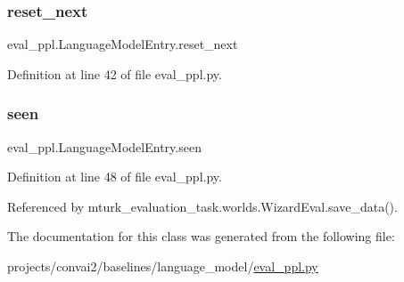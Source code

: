 \subsubsection{\texorpdfstring{reset\+\_\+next}{reset\_next}}
{\footnotesize\ttfamily eval\+\_\+ppl.\+Language\+Model\+Entry.\+reset\+\_\+next}



Definition at line 42 of file eval\+\_\+ppl.\+py.

\mbox{\label{classeval__ppl_1_1LanguageModelEntry_adbd6dba726e3a9f80630a2d2ccc9dc68}} 
\subsubsection{\texorpdfstring{seen}{seen}}
{\footnotesize\ttfamily eval\+\_\+ppl.\+Language\+Model\+Entry.\+seen}



Definition at line 48 of file eval\+\_\+ppl.\+py.



Referenced by mturk\+\_\+evaluation\+\_\+task.\+worlds.\+Wizard\+Eval.\+save\+\_\+data().



The documentation for this class was generated from the following file\+:\begin{DoxyCompactItemize}
\item 
projects/convai2/baselines/language\+\_\+model/\hyperlink{projects_2convai2_2baselines_2language__model_2eval__ppl_8py}{eval\+\_\+ppl.\+py}\end{DoxyCompactItemize}

